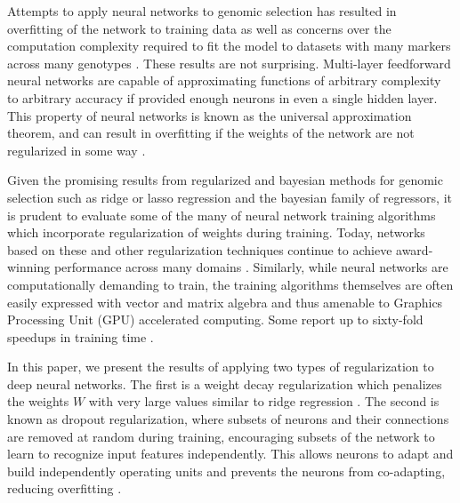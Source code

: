 Attempts to apply neural networks to genomic selection has resulted in overfitting of the 
network to training data as well as concerns over the 
computation complexity required to fit the model to datasets with many
markers across many genotypes \citep{heslot2012, gonzalez-recio2014}. 
These results are not surprising. Multi-layer feedforward neural networks 
are capable of approximating functions of arbitrary complexity to arbitrary 
accuracy if provided enough neurons in even a single hidden 
layer. This property of neural networks is known as the 
universal approximation theorem, and can result in 
overfitting if the weights of the network are not regularized in some way \citep{hornik1989}.

Given the promising results from regularized and bayesian methods for 
genomic selection such as ridge or lasso regression and the bayesian family of regressors,
it is prudent to evaluate some of the many of neural network training algorithms which
incorporate regularization of weights during training. Today, networks based on these 
and other regularization techniques continue to achieve award-winning performance 
across many domains \citep{schmidhuber2015}. Similarly, while neural networks are 
computationally demanding to train, the training algorithms 
themselves are often easily expressed with vector and matrix algebra and thus amenable to
Graphics Processing Unit (GPU) accelerated computing. Some report up to sixty-fold speedups 
in training time \citep{sierra2010, schmidhuber2015}. 

In this paper, we present the results of applying two types of regularization
to deep neural networks. The first is a weight decay regularization
which penalizes the weights $W$ with very large values 
similar to ridge regression \citep{krogh1992}. The second is known as dropout 
regularization, where subsets of neurons and their connections are removed 
at random during training, encouraging subsets of the network to learn 
to recognize input features independently. This allows neurons to adapt 
and build independently operating units and prevents the 
neurons from co-adapting, reducing overfitting \citep{srivastava2014}.  


